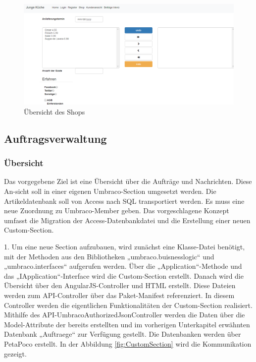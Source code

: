\begin{figure}[h]
	\centering
	\includegraphics[width=1\linewidth]{Graphics/shop.png}
	\caption[Shop]{Übersicht des Shops}
	\label{fig:Shop}
\end{figure}


\subsection{Auftragsverwaltung}

\subsubsection{Übersicht}

Das vorgegebene Ziel ist eine Übersicht über die Aufträge und Nachrichten. Diese An-sicht soll in einer eigenen Umbraco-Section umgesetzt werden. Die Artikeldatenbank soll von Access nach SQL transportiert werden. Es muss eine neue Zuordnung zu Umbraco-Member geben.
Das vorgeschlagene Konzept umfasst die Migration der Access-Datenbankdatei und die Erstellung einer neuen Custom-Section.

1.	Um eine neue Section aufzubauen, wird zunächst eine Klasse-Datei benötigt, mit der Methoden aus den Bibliotheken „umbraco.buisnesslogic“ und „umbraco.interfaces“ aufgerufen werden. Über die „Application“-Methode und das „IApplication“-Interface wird die Custom-Section erstellt. Danach  wird die Übersicht über den AngularJS-Controller und HTML erstellt. Diese Dateien werden zum API-Controller über das Paket-Manifest referenziert. In diesem Controller werden die eigentlichen Funktionalitäten der Custom-Section realisiert. Mithilfe des API-UmbracoAuthorizedJsonController werden die Daten über die Model-Attribute der bereits erstellten und im vorherigen Unterkapitel erwähnten Datenbank „Auftraege“ zur Verfügung gestellt. Die Datenbanken werden über PetaPoco erstellt. In der Abbildung \ref{fig:CustomSection} wird die Kommunikation gezeigt.
 
